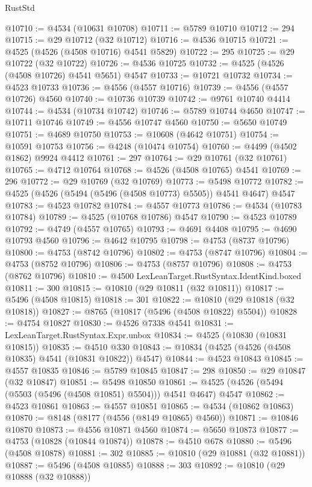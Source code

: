 \begin{lexlean}{RustStd}
\begin{coremodule}
@10710 := @4534 (@10631 @10708)
@10711 := @5789 @10710
@10712 := 294
@10715 := @29 @10712 (@32 @10712)
@10716 := @4536 @10715
@10721 := @4525 (@4526 (@4508 @10716) @4541 @5829)
@10722 := 295
@10725 := @29 @10722 (@32 @10722)
@10726 := @4536 @10725
@10732 := @4525 (@4526 (@4508 @10726) @4541 @5651) @4547
@10733 := @10721 @10732
@10734 := @4523 @10733
@10736 := @4556 (@4557 @10716)
@10739 := @4556 (@4557 @10726) @4560
@10740 := @10736 @10739
@10742 := @9761 @10740 @4414
@10744 := @4534 (@10734 @10742)
@10746 := @5789 @10744 @4650
@10747 := @10711 @10746
@10749 := @4556 @10747 @4560
@10750 := @5650 @10749
@10751 := @4689 @10750
@10753 := @10608 (@4642 @10751)
@10754 := @10591 @10753
@10756 := @4248 (@10474 @10754)
@10760 := @4499 (@4502 @1862) @9924 @4412
@10761 := 297
@10764 := @29 @10761 (@32 @10761)
@10765 := @4712 @10764
@10768 := @4526 (@4508 @10765) @4541
@10769 := 296
@10772 := @29 @10769 (@32 @10769)
@10773 := @5498 @10772
@10782 := @4525 (@4526 (@5494 (@5496 (@4508 @10773) @5505)) @4541 @4647) @4547
@10783 := @4523 @10782
@10784 := @4557 @10773
@10786 := @4534 (@10783 @10784)
@10789 := @4525 (@10768 @10786) @4547
@10790 := @4523 @10789
@10792 := @4749 (@4557 @10765)
@10793 := @4691 @4408
@10795 := @4690 @10793 @4560
@10796 := @4642 @10795
@10798 := @4753 (@8737 @10796)
@10800 := @4753 (@8742 @10796)
@10802 := @4753 (@8747 @10796)
@10804 := @4753 (@8752 @10796)
@10806 := @4753 (@8757 @10796)
@10808 := @4753 (@8762 @10796)
@10810 := @4500 LexLeanTarget.RustSyntax.IdentKind.boxed
@10811 := 300
@10815 := @10810 (@29 @10811 (@32 @10811))
@10817 := @5496 (@4508 @10815)
@10818 := 301
@10822 := @10810 (@29 @10818 (@32 @10818))
@10827 := @8765 (@10817 (@5496 (@4508 @10822) @5504))
@10828 := @4754 @10827
@10830 := @4526 @7338 @4541
@10831 := LexLeanTarget.RustSyntax.Expr.unbox
@10834 := @4525 (@10830 (@10831 @10815))
@10835 := @4510 @330
@10843 := @10834 (@4525 (@4526 (@4508 @10835) @4541 (@10831 @10822)) @4547)
@10844 := @4523 @10843
@10845 := @4557 @10835
@10846 := @5789 @10845
@10847 := 298
@10850 := @29 @10847 (@32 @10847)
@10851 := @5498 @10850
@10861 := @4525 (@4526 (@5494 (@5503 (@5496 (@4508 @10851) @5504))) @4541 @4647) @4547
@10862 := @4523 @10861
@10863 := @4557 @10851
@10865 := @4534 (@10862 @10863)
@10870 := @8148 (@8177 (@4556 (@8149 @10865) @4560))
@10871 := @10846 @10870
@10873 := @4556 @10871 @4560
@10874 := @5650 @10873
@10877 := @4753 (@10828 (@10844 @10874))
@10878 := @4510 @678
@10880 := @5496 (@4508 @10878)
@10881 := 302
@10885 := @10810 (@29 @10881 (@32 @10881))
@10887 := @5496 (@4508 @10885)
@10888 := 303
@10892 := @10810 (@29 @10888 (@32 @10888))

\end{coremodule}
\end{lexlean}
